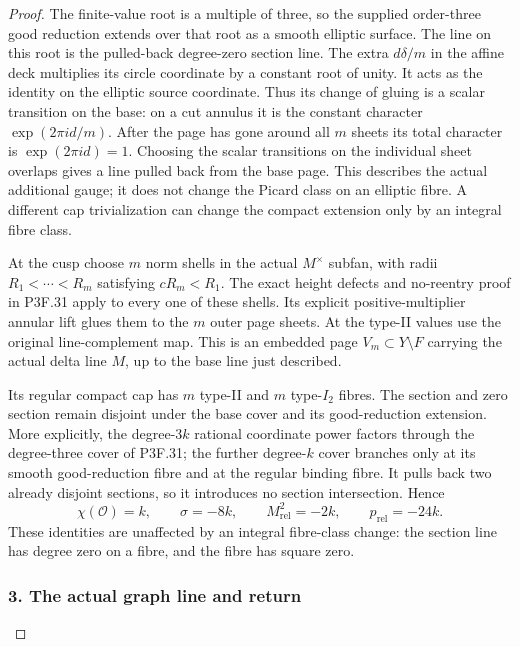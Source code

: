 \begin{proof}
The finite-value root is a multiple of three, so the supplied order-three good reduction extends over that root as a smooth elliptic surface. The line on this root is the pulled-back degree-zero section line. The extra \(d\delta/m\) in the affine deck multiplies its circle coordinate by a constant root of unity. It acts as the identity on the elliptic source coordinate. Thus its change of gluing is a scalar transition on the base: on a cut annulus it is the constant character \(\exp(2\pi i d/m)\). After the page has gone around all \(m\) sheets its total character is \(\exp(2\pi i d)=1\). Choosing the scalar transitions on the individual sheet overlaps gives a line pulled back from the base page. This describes the actual additional gauge; it does not change the Picard class on an elliptic fibre. A different cap trivialization can change the compact extension only by an integral fibre class.

At the cusp choose \(m\) norm shells in the actual \(M^\times\) subfan, with radii \(R_1<\cdots<R_m\) satisfying \(cR_m<R_1\). The exact height defects and no-reentry proof in P3F.31 apply to every one of these shells. Its explicit positive-multiplier annular lift glues them to the \(m\) outer page sheets. At the type-II values use the original line-complement map. This is an embedded page \(V_m\subset Y\setminus F\) carrying the actual delta line \(M\), up to the base line just described.

Its regular compact cap has \(m\) type-II and \(m\) type-\(I_2\) fibres. The section and zero section remain disjoint under the base cover and its good-reduction extension. More explicitly, the degree-\(3k\) rational coordinate power factors through the degree-three cover of P3F.31; the further degree-\(k\) cover branches only at its smooth good-reduction fibre and at the regular binding fibre. It pulls back two already disjoint sections, so it introduces no section intersection. Hence \[
 \chi(\mathcal O)=k,\qquad \sigma=-8k,\qquad
 M_{\mathrm{rel}}^2=-2k,\qquad p_{\mathrm{rel}}=-24k.
\] These identities are unaffected by an integral fibre-class change: the section line has degree zero on a fibre, and the fibre has square zero.

\subsubsection{3. The actual graph line and return}\label{the-actual-graph-line-and-return}


\end{proof}
